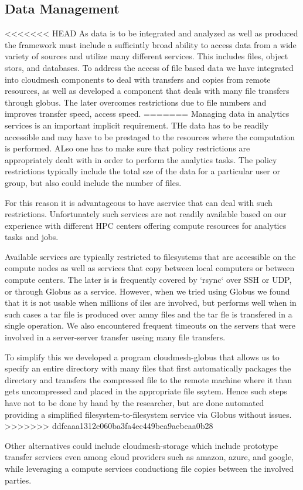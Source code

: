 \subsection{Data Management}
\label{sec:data}

<<<<<<< HEAD
As data is to be integrated and analyzed as well as produced the
framework must include a sufficintly broad ability to access data from
a wide variety of sources and utilize many different services.  This
includes files, object stors, and databases.  To address the access of
file based data we have integrated into cloudmesh components to deal
with transfers and copies from remote resources, as well as developed
a component that deals with many file transfers through globus. The
later overcomes restrictions due to file numbers and improves transfer
speed, access speed.
=======
Managing data in analytics services is an important implicit
requirement. THe data has to be readily accessible and may have to be
prestaged to the resources where the computation is performed. ALso
one has to make sure that policy restrictions are appropriately dealt
with in order to perform the analytics tasks. The policy restrictions
typically include the total sze of the data for a particular user or
group, but also could include the number of files.

For this reason it is advantageous to have aservice that can deal with
such restrictions. Unfortunately such services are not readily
available based on our experience with different HPC centers offering
compute resources for analytics tasks and jobs.

Available services are typically restricted to filesystems that are
accessible on the compute nodes as well as services that copy between
local computers or between compute centers. The later is is frequently
covered by `rsync` over SSH or UDP, or through
Globus \cite{www-globus-transfer} as a service. However, when we tried
using Globus we found that it is not usable when millions of iles are
involved, but performs well when in such cases a tar file is produced
over amny files and the tar fle is transfered in a single
operation. We also encountered frequent timeouts on the servers that
were involved in a server-server transfer useing many file transfers.

To simplify this we developed a program
cloudmesh-globus \cite{cloudmesh-globus} that allows us to specify an
entire directory with many files that first automatically packages the
directory and transfers the compressed file to the remote machine
where it than gets uncompressed and placed in the appropriate file
ssytem. Hence such steps have not to be done by hand by the
researcher, but are done automated providing a simplified
filesystem-to-filesystem service via Globus without issues.
>>>>>>> ddfcaaa1312e060ba3fa4ec449bea9aebeaa0b28

Other alternatives could include
cloudmesh-storage \cite{cloudmesh-storage} which include prototype
transfer services even among cloud providers such as amazon, azure,
and google, while leveraging a compute services conductiong file
copies between the involved parties.


